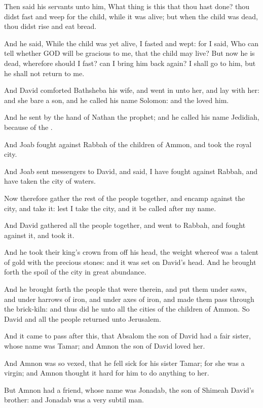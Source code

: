 \Verse Then said his servants unto him, What thing is this that thou hast done? thou didst fast and weep for the child, while it was alive; but when the child was dead, thou didst rise and eat bread.

\Verse And he said, While the child was yet alive, I fasted and wept: for I said, Who can tell whether GOD will be gracious to me, that the child may live?  \Verse But now he is dead, wherefore should I fast?  can I bring him back again? I shall go to him, but he shall not return to me.

\Verse And David comforted Bathsheba his wife, and went in unto her, and lay with her: and she bare a son, and he called his name Solomon: and the \LORD loved him.

\Verse And he sent by the hand of Nathan the prophet; and he called his name Jedidiah, because of the \LORD.

\Verse And Joab fought against Rabbah of the children of Ammon, and took the royal city.

\Verse And Joab sent messengers to David, and said, I have fought against Rabbah, and have taken the city of waters.

\Verse Now therefore gather the rest of the people together, and encamp against the city, and take it: lest I take the city, and it be called after my name.

\Verse And David gathered all the people together, and went to Rabbah, and fought against it, and took it.

\Verse And he took their king's crown from off his head, the weight whereof was a talent of gold with the precious stones: and it was set on David's head. And he brought forth the spoil of the city in great abundance.

\Verse And he brought forth the people that were therein, and put them under saws, and under harrows of iron, and under axes of iron, and made them pass through the brick-kiln: and thus did he unto all the cities of the children of Ammon. So David and all the people returned unto Jerusalem.


\Chapter
\Verse And it came to pass after this, that Absalom the son of David had a fair sister, whose name was Tamar; and Amnon the son of David loved her.

\Verse And Amnon was so vexed, that he fell sick for his sister Tamar; for she was a virgin; and Amnon thought it hard for him to do anything to her.

\Verse But Amnon had a friend, whose name was Jonadab, the son of Shimeah David's brother: and Jonadab was a very subtil man.

